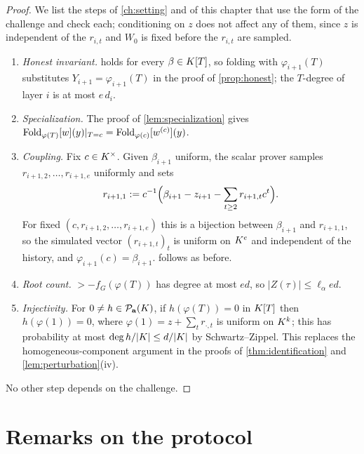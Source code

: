\begin{proof}
We list the steps of \cref{ch:setting} and of this chapter that use the form of the
challenge and check each; conditioning on $z$ does not affect any of them, since $z$ is
independent of the $r_{i,t}$ and $W_0$ is fixed before the $r_{i,t}$ are sampled.
\begin{enumerate}[label=\textup{(\roman*)}]
\item \emph{Honest invariant.}  holds for every $\beta\in K[T]$, so
folding with $\varphi_{i+1}(T)$ substitutes $Y_{i+1}=\varphi_{i+1}(T)$ in the proof of
\cref{prop:honest}; the $T$-degree of layer $i$ is at most $e\,d_i$.
\item \emph{Specialization.} The proof of \cref{lem:specialization} gives
$\mathrm{Fold}_{\varphi(T)}[w](y)|_{T=c}=\mathrm{Fold}_{\varphi(c)}[w^{(c)}](y)$.
\item \emph{Coupling.} Fix $c\in K^\times$. Given $\beta_{i+1}$ uniform, the scalar prover
samples $r_{i+1,2},\dots,r_{i+1,e}$ uniformly and sets
\[
r_{i+1,1}:=c^{-1}\Bigl(\beta_{i+1}-z_{i+1}-\sum_{t\ge2}r_{i+1,t}c^t\Bigr).
\]
For fixed
$(c,r_{i+1,2},\dots,r_{i+1,e})$ this is a bijection between $\beta_{i+1}$ and
$r_{i+1,1}$, so the simulated vector $(r_{i+1,t})_t$ is uniform on $K^e$ and independent
of the history, and $\varphi_{i+1}(c)=\beta_{i+1}$.  follows as before.
\item \emph{Root count.} $\gt-f_G(\varphi(T))$ has degree at most $ed$, so
$|Z(\tau)|\le\ell_\alpha ed$.
\item \emph{Injectivity.} For $0\ne h\in\mathcal{P}_{\mathbf a}(K)$, if $h(\varphi(T))=0$ in $K[T]$ then
$h(\varphi(1))=0$, where $\varphi(1)=z+\sum_tr_{\cdot,t}$ is uniform on $K^k$; this has
probability at most $\deg h/|K|\le d/|K|$ by Schwartz--Zippel. This replaces the
homogeneous-component argument in the proofs of \cref{thm:identification} and
\cref{lem:perturbation}(iv).
\end{enumerate}
No other step depends on the challenge.
\end{proof}

\section{Remarks on the protocol}

